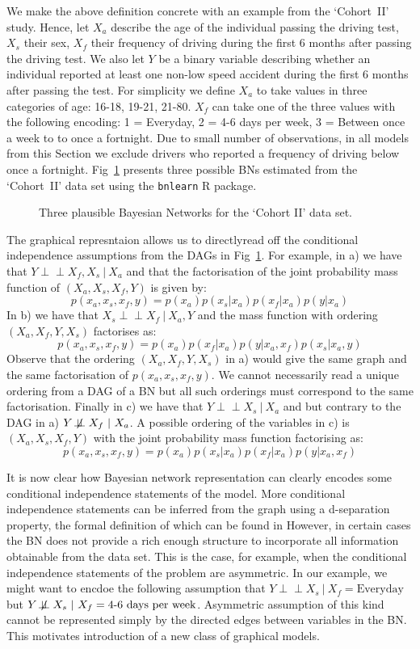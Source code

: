 \documentclass[runningheads]{llncs}
\newcommand{\ind}{\perp\!\!\!\!\perp}
\newcommand{\notind}{\not\!\perp\!\!\!\perp}
\begin{document}
We make the above definition concrete with an example from the `Cohort~II' study. Hence, let $X_a$ describe the age of the individual passing the driving test, $X_s$ their sex, $X_f$ their frequency of driving during the first 6 months after passing the driving test. We also let $Y$ be a binary variable describing whether an individual reported at least one non-low speed accident during the first 6 months after passing the test. For simplicity we define $X_a$ to take values in three categories of age: 16-18, 19-21, 21-80. $X_f$ can take one of the three values with the following encoding: 1 = Everyday,  2 = 4-6 days per week, 3 = Between once a week to to once a fortnight. Due to small number of observations, in all models from this Section we exclude drivers who reported a frequency of driving below once a fortnight. Fig~\ref{bayesnets} presents three possible BNs estimated from the `Cohort~II' data set using the \texttt{bnlearn} R package.
\begin{figure}[ht]
\centering

\caption{Three plausible Bayesian Networks for the `Cohort II' data set.}
\label{bayesnets}
\end{figure}
The graphical represntaion allows us to directlyread off the conditional independence assumptions from the DAGs in Fig~\ref{bayesnets}. For example, in a) we have that $Y \ind X_f, X_s \ | \ X_a$ and that the factorisation of the joint probability mass function of $(X_a, X_s, X_f, Y)$ is given by:
\[p(x_a, x_s, x_f, y) = p(x_a)p(x_s|x_a)p(x_f|x_a)p(y|x_a)\]
In b) we have that $X_s \ind X_f \ | \ X_a, Y$ and the mass function with ordering $(X_a, X_f, Y, X_s)$ factorises as:
\[p(x_a, x_s, x_f, y) = p(x_a)p(x_f|x_a)p(y|x_a, x_f)p(x_s|x_a, y)\]
Observe that the ordering $(X_a, X_f, Y, X_s)$ in a) would give the same graph and the same factorisation of $p(x_a, x_s, x_f, y)$. We cannot necessarily read a unique ordering from a DAG of a BN but all such orderings must correspond to the same factorisation.
Finally in c) we have that $Y \ind X_s \ | \ X_a$ and but contrary to the DAG in a) $Y \notind X_f\ | \ X_a$. A possible ordering of the variables in c) is $(X_a, X_s, X_f, Y)$ with the joint probability mass function factorising as:
\[p(x_a, x_s, x_f, y) = p(x_a)p(x_s|x_a)p(x_f|x_a)p(y|x_a, x_f)\]

It is now clear how Bayesian network representation can clearly encodes some conditional independence statements of the model. More conditional independence statements can be inferred from the graph using a d-separation property, the formal definition of which can be found in \cite{}
However, in certain cases the BN does not provide a rich enough structure to incorporate all information obtainable from the data set. This is the case, for example, when the conditional independence statements of the problem are asymmetric. In our example, we might want to encdoe the following assumption that $Y \ind X_s\ | \ X_f = \text{Everyday}$ but $Y \notind X_s\ | \ X_f = \text{4-6 days per week}$. Asymmetric assumption of this kind cannot be represented simply by the directed edges between variables in the BN. This motivates introduction of a new class of graphical models. 
\end{document}

